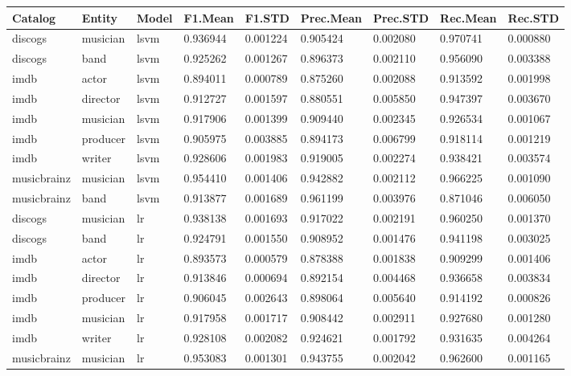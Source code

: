 \documentclass[epsfig,a4paper,11pt,titlepage,twoside,openany]{book}
\begin{document}
\begin{longtable}{|l|l|l|l|l|l|l|l|l|}
\hline
Catalog     & Entity   & Model & F1.Mean  & F1.STD   & Prec.Mean & Prec.STD & Rec.Mean & Rec.STD  \\ \hline
discogs     & musician & lsvm  & 0.936944 & 0.001224 & 0.905424  & 0.002080 & 0.970741 & 0.000880 \\
discogs     & band     & lsvm  & 0.925262 & 0.001267 & 0.896373  & 0.002110 & 0.956090 & 0.003388 \\
imdb        & actor    & lsvm  & 0.894011 & 0.000789 & 0.875260  & 0.002088 & 0.913592 & 0.001998 \\
imdb        & director & lsvm  & 0.912727 & 0.001597 & 0.880551  & 0.005850 & 0.947397 & 0.003670 \\
imdb        & musician & lsvm  & 0.917906 & 0.001399 & 0.909440  & 0.002345 & 0.926534 & 0.001067 \\
imdb        & producer & lsvm  & 0.905975 & 0.003885 & 0.894173  & 0.006799 & 0.918114 & 0.001219 \\
imdb        & writer   & lsvm  & 0.928606 & 0.001983 & 0.919005  & 0.002274 & 0.938421 & 0.003574 \\
musicbrainz & musician & lsvm  & 0.954410 & 0.001406 & 0.942882  & 0.002112 & 0.966225 & 0.001090 \\ 
musicbrainz & band     & lsvm  & 0.913877 & 0.001689 & 0.961199  & 0.003976 & 0.871046 & 0.006050 \\ \hline
discogs     & musician & lr    & 0.938138 & 0.001693 & 0.917022  & 0.002191 & 0.960250 & 0.001370 \\
discogs     & band     & lr    & 0.924791 & 0.001550 & 0.908952  & 0.001476 & 0.941198 & 0.003025 \\
imdb        & actor    & lr    & 0.893573 & 0.000579 & 0.878388  & 0.001838 & 0.909299 & 0.001406 \\
imdb        & director & lr    & 0.913846 & 0.000694 & 0.892154  & 0.004468 & 0.936658 & 0.003834 \\
imdb        & producer & lr    & 0.906045 & 0.002643 & 0.898064  & 0.005640 & 0.914192 & 0.000826 \\
imdb        & musician & lr    & 0.917958 & 0.001717 & 0.908442  & 0.002911 & 0.927680 & 0.001280 \\
imdb        & writer   & lr    & 0.928108 & 0.002082 & 0.924621  & 0.001792 & 0.931635 & 0.004264 \\
musicbrainz & musician & lr    & 0.953083 & 0.001301 & 0.943755  & 0.002042 & 0.962600 & 0.001165 \\ 

\end{longtable}
\end{document}
